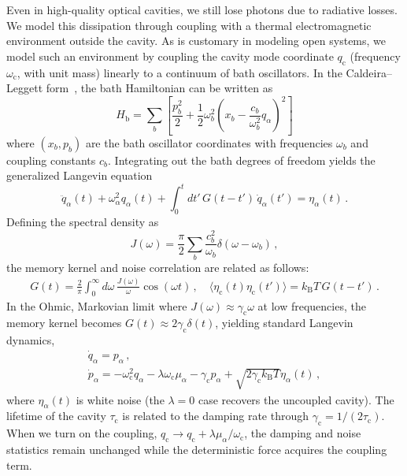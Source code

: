 Even in high-quality optical cavities, we still lose photons due to radiative losses.
We model this dissipation through coupling with a thermal electromagnetic environment outside the cavity. 
As is customary in modeling open systems, we model such an environment by coupling the cavity mode coordinate $q_\mathrm{c}$ (frequency $\omega_\mathrm{c}$, with  unit  mass) linearly to a continuum of bath oscillators.  %
In the Caldeira--Leggett form~\cite{caldeira1983path}, the bath Hamiltonian can be written as
\begin{equation}
H_\mathrm{b} = \sum_{b} \left[\frac{p_b^2}{2} + \frac{1}{2} \omega_b^2 \left(x_b - \frac{c_b}{ \omega_b^2} q_\alpha\right)^2 \right]
\end{equation}
where $(x_b, p_b)$ are the bath oscillator coordinates with frequencies $\omega_b$ and coupling constants $c_b$. Integrating out the bath degrees of freedom yields the generalized Langevin equation
\begin{equation}
\ddot{q}_\alpha(t) + \omega_\alpha^2 q_\alpha(t) + \int_0^t \!\! dt' \, G(t-t') \, \dot{q}_\alpha(t') = \eta_\alpha(t) \,.
\end{equation}
Defining the spectral density as
\begin{equation}
J(\omega) = \frac{\pi}{2} \sum_{b} \frac{c_b^2}{\omega_b} \delta(\omega - \omega_b) \,,
\end{equation}
the memory kernel and noise correlation are related as follows:
\begin{gather}
G(t) = \frac{2}{\pi} \int_0^\infty \!\! d\omega \, \frac{J(\omega)}{\omega} \cos(\omega t) \,, \quad \langle \eta_\mathrm{c}(t) \eta_\mathrm{c}(t') \rangle = k_\mathrm{B} T \, G(t-t') \,.
\end{gather}
In the Ohmic, Markovian limit where $J(\omega) \approx \gamma_\mathrm{c} \omega$ at low frequencies, the memory kernel becomes $G(t) \approx 2\gamma_\mathrm{c} \delta(t)$, yielding standard Langevin dynamics,
\begin{gather}
\dot{q}_{\alpha} = p_\alpha \label{eq:langevin_cavity_1} \,, \\
\dot{p}_\alpha = -\omega_\mathrm{c}^2 q_\alpha - \lambda \omega_\mathrm{c} \mu_\alpha -\gamma_\mathrm{c} p_\alpha +\sqrt{2 \gamma_\mathrm{c} k_\mathrm{B} T } \eta_\alpha(t)  \,, \label{eq:langevin_cavity_2}
\end{gather}
where $\eta_\alpha(t)$ is white noise (the $\lambda=0$ case recovers the uncoupled cavity).
The lifetime of the cavity $\tau_\mathrm{c}$ is related to the damping rate through $\gamma_\mathrm{c} = 1/(2\tau_\mathrm{c})$.
When we turn on the coupling, $q_\mathrm{c} \to q_\mathrm{c} + \lambda \mu_\alpha / \omega_\mathrm{c}$, the damping and noise statistics remain unchanged while the deterministic force acquires the coupling term.

